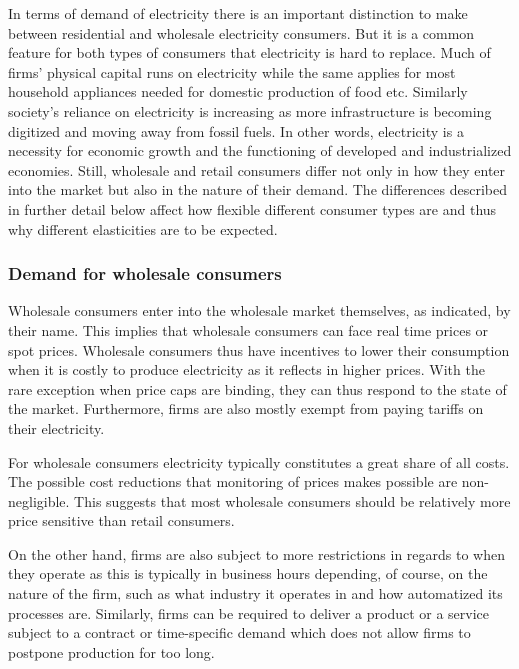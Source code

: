 In terms of demand of electricity there is an important distinction to make between residential and wholesale electricity consumers. But it is a common feature for both types of consumers that electricity is hard to replace. Much of firms' physical capital runs on electricity while the same applies for most household appliances needed for domestic production of food etc. Similarly society's reliance on electricity is increasing as more infrastructure is becoming digitized and moving away from fossil fuels. In other words, electricity is a necessity for economic growth and the functioning of developed and industrialized economies. Still, wholesale and retail consumers differ not only in how they enter into the market but also in the nature of their demand. The differences described in further detail below affect how flexible different consumer types are and thus why different elasticities are to be expected.

\subsubsection*{Demand for wholesale consumers}
Wholesale consumers enter into the wholesale market themselves, as indicated, by their name. This implies that wholesale consumers can face real time prices or spot prices. Wholesale consumers thus have incentives to lower their consumption when it is costly to produce electricity as it reflects in higher prices. With the rare exception when price caps are binding, they can thus respond to the state of the market. Furthermore, firms are also mostly exempt from paying tariffs on their electricity.
\bigskip \par
For wholesale consumers electricity typically constitutes a great share of all costs. The possible cost reductions that monitoring of prices makes possible are non-negligible. This suggests that most wholesale consumers should be relatively more price sensitive than retail consumers.
\par
On the other hand, firms are also subject to more restrictions in regards to when they operate as this is typically in business hours depending, of course, on the nature of the firm, such as what industry it operates in and how automatized its processes are. Similarly, firms can be required to deliver a product or a service subject to a contract or time-specific demand which does not allow firms to postpone production for too long.

